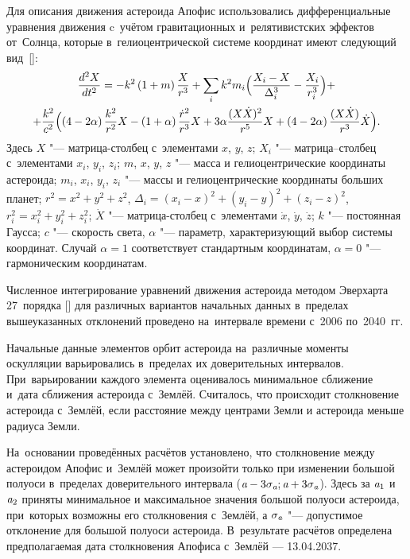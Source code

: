Для описания движения астероида Апофис использовались дифференциальные уравнения движения  c~учётом гравитационных и~релятивистских эффектов от~Солнца, которые в~гелиоцентрической системе координат имеют следующий вид~[]:
\begin{multline*}
	\frac{d^{2}X}{dt^{2}}=-k^{2}\left(1+m\right)\frac{X}{r^{3}}+\sum_{i}k^{2}m_{i}\Bigl(\frac{X_{i}-X}{\Delta^{3}_{i}}-\frac{X_{i}}{r_{i}^{3}}\Bigr)+\\
	+\frac{k^{2}}{c^{2}}\Bigl(\left(4-2\alpha\right)\frac{k^{2}}{r^{2}}X-\left(1+\alpha\right)\frac{\dot r^{2}}{r^{3}}X+3\alpha\frac{(X\dot X)^{2}}{r^{5}}X+\left(4-2\alpha\right)\frac{(X\dot X)}{r^{3}}\dot X\Bigr).
\end{multline*}
Здесь $X$ "--- матрица-столбец с~элементами $x$, $y$, $z$; 
$X_{i}$ "--- матрица--столбец с~элементами $x_{i}$, $y_{i}$, $z_{i}$;
$m$, $x$, $y$, $z$ "--- масса и гелиоцентрические координаты астероида;
 $m_{i}$, $x_{i}$, $y_{i}$, $z_{i}$ "--- массы и гелиоцентрические координаты больших планет;
 $r^{2}=x^{2}+y^{2}+z^{2}$,
 $\Delta_i=\left(x_{i}-x\right)^{2}+\left(y_{i}-y\right)^{2}+\left(z_{i}-z\right)^{2}$,
 $r^{2}_{i}=x^{2}_{i}+y^{2}_{i}+z^{2}_{i}$;
 $\dot X$ "--- матрица-столбец с~элементами $\dot x$, $\dot y$, $\dot z$;
 $k$ "--- постоянная Гаусса; $c$ "--- скорость света, $\alpha$ "--- параметр, характеризующий выбор системы координат.
 Случай $\alpha=1$ соответствует стандартным координатам, $\alpha =0$ "--- гармоническим координатам. 


Численное интегрирование уравнений движения астероида методом Эверхарта 27~порядка  []
для различных вариантов начальных данных в~пределах вышеуказанных отклонений проведено на~интервале времени с~2006 по~2040~гг.

Начальные данные элементов орбит астероида на~различные моменты оскулляции варьировались в~пределах их доверительных интервалов. При~варьировании каждого элемента  оценивалось минимальное сближение и~дата сближения астероида с~Землёй. 
Считалось, что происходит столкновение астероида с~Землёй,  если расстояние между центрами Земли и астероида меньше радиуса Земли.

На~основании проведённых расчётов установлено, что столкновение между астероидом Апофис и~Землёй может произойти только при изменении большой полуоси  в~пределах доверительного интервала ($\emph{a}-3\sigma_{\emph{a}}; \emph{a}+3\sigma_{\emph{a}}$).
Здесь за $\emph{a}_{1}$ и $\emph{a}_{2}$ приняты минимальное и максимальное значения большой полуоси астероида, при~которых возможны его столкновения с~Землёй, а $\sigma_{\emph{a}}$ "--- допустимое отклонение для большой полуоси астероида.
В~результате расчётов определена предполагаемая дата столкновения Апофиса с~Землёй --- 13.04.2037.

